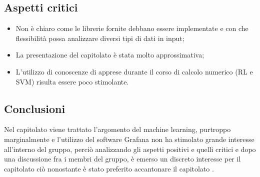 \subsection{Aspetti critici}
\begin{itemize}
\item Non \`e chiaro come le librerie fornite debbano essere implementate e con che flessibilit\`a possa analizzare diversi tipi di dati in input;
\item La presentazione del capitolato \`e stata molto approssimativa;
\item L'utilizzo di conoscenze di apprese durante il corso di calcolo numerico (RL e SVM) risulta essere poco stimolante.

\end{itemize}
\subsection{Conclusioni}
Nel capitolato viene trattato l'argomento del machine learning,  purtroppo marginalmente e l'utilizzo del software Grafana non ha stimolato grande interesse all'interno del gruppo, perci\`o analizzando gli aspetti positivi e quelli critici e dopo una discussione fra i membri del gruppo, \`e emerso un discreto interesse per il capitolato ci\`o nonostante \`e stato preferito accantonare il capitolato .